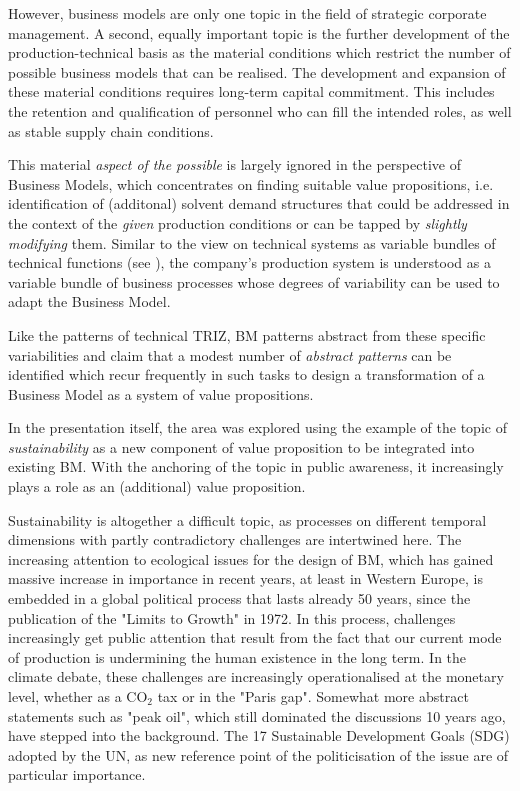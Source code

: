 \documentclass[11pt,a4paper]{article}
\begin{document}
However, business models are only one topic in the field of strategic
corporate management. A second, equally important topic is the further
development of the production-technical basis as the material conditions which
restrict the number of possible business models that can be realised. The
development and expansion of these material conditions requires long-term
capital commitment. This includes the retention and qualification of personnel
who can fill the intended roles, as well as stable supply chain conditions.

This material \emph{aspect of the possible} is largely ignored in the
perspective of Business Models, which concentrates on finding suitable value
propositions, i.e. identification of (additonal) solvent demand structures
that could be addressed in the context of the \emph{given} production
conditions or can be tapped by \emph{slightly modifying} them. Similar to the
view on technical systems as variable bundles of technical functions (see
\cite{Graebe-dat}), the company's production system is understood as a
variable bundle of business processes whose degrees of variability can be used
to adapt the Business Model.

Like the patterns of technical TRIZ, BM patterns abstract from these specific
variabilities and claim that a modest number of \emph{abstract patterns} can
be identified which recur frequently in such tasks to design a transformation
of a Business Model as a system of value propositions.

In the presentation itself, the area was explored using the example of the
topic of \emph{sustainability} as a new component of value proposition to be
integrated into existing BM. With the anchoring of the topic in public
awareness, it increasingly plays a role as an (additional) value proposition.

Sustainability is altogether a difficult topic, as processes on different
temporal dimensions with partly contradictory challenges are intertwined here.
The increasing attention to ecological issues for the design of BM, which has
gained massive increase in importance in recent years, at least in Western
Europe, is embedded in a global political process that lasts already 50 years,
since the publication of the "Limits to Growth" in 1972. In this process,
challenges increasingly get public attention that result from the fact that
our current mode of production is undermining the human existence in the long
term. In the climate debate, these challenges are increasingly operationalised
at the monetary level, whether as a CO$_2$ tax or in the "Paris gap". Somewhat
more abstract statements such as "peak oil", which still dominated the
discussions 10 years ago, have stepped into the background. The 17 Sustainable
Development Goals (SDG) adopted by the UN, as new reference point of the
politicisation of the issue are of particular importance.
\end{document}
